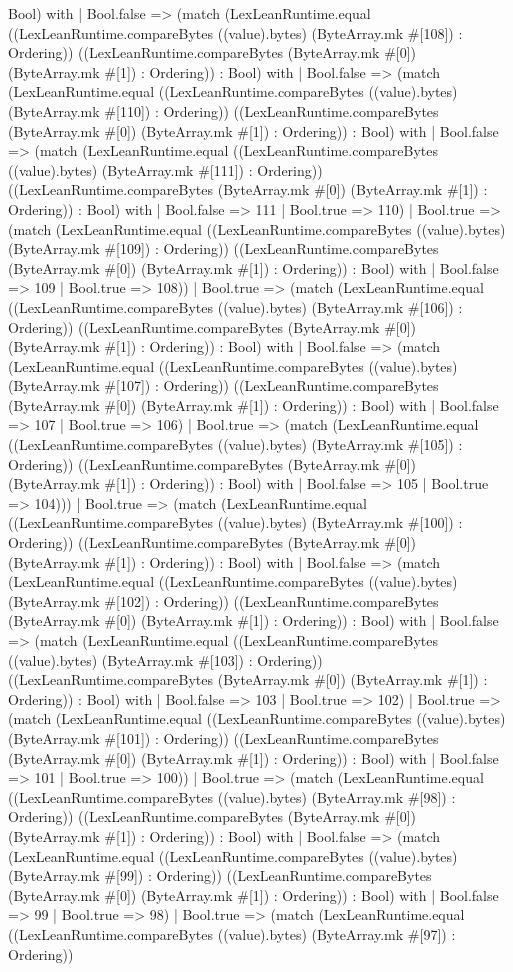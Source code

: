 \documentclass[11pt]{article}
\begin{document}
Bool) with | Bool.false => (match (LexLeanRuntime.equal ((LexLeanRuntime.compareBytes ((value).bytes) (ByteArray.mk \#[108]) : Ordering)) ((LexLeanRuntime.compareBytes (ByteArray.mk \#[0]) (ByteArray.mk \#[1]) : Ordering)) : Bool) with | Bool.false => (match (LexLeanRuntime.equal ((LexLeanRuntime.compareBytes ((value).bytes) (ByteArray.mk \#[110]) : Ordering)) ((LexLeanRuntime.compareBytes (ByteArray.mk \#[0]) (ByteArray.mk \#[1]) : Ordering)) : Bool) with | Bool.false => (match (LexLeanRuntime.equal ((LexLeanRuntime.compareBytes ((value).bytes) (ByteArray.mk \#[111]) : Ordering)) ((LexLeanRuntime.compareBytes (ByteArray.mk \#[0]) (ByteArray.mk \#[1]) : Ordering)) : Bool) with | Bool.false => 111 | Bool.true => 110) | Bool.true => (match (LexLeanRuntime.equal ((LexLeanRuntime.compareBytes ((value).bytes) (ByteArray.mk \#[109]) : Ordering)) ((LexLeanRuntime.compareBytes (ByteArray.mk \#[0]) (ByteArray.mk \#[1]) : Ordering)) : Bool) with | Bool.false => 109 | Bool.true => 108)) | Bool.true => (match (LexLeanRuntime.equal ((LexLeanRuntime.compareBytes ((value).bytes) (ByteArray.mk \#[106]) : Ordering)) ((LexLeanRuntime.compareBytes (ByteArray.mk \#[0]) (ByteArray.mk \#[1]) : Ordering)) : Bool) with | Bool.false => (match (LexLeanRuntime.equal ((LexLeanRuntime.compareBytes ((value).bytes) (ByteArray.mk \#[107]) : Ordering)) ((LexLeanRuntime.compareBytes (ByteArray.mk \#[0]) (ByteArray.mk \#[1]) : Ordering)) : Bool) with | Bool.false => 107 | Bool.true => 106) | Bool.true => (match (LexLeanRuntime.equal ((LexLeanRuntime.compareBytes ((value).bytes) (ByteArray.mk \#[105]) : Ordering)) ((LexLeanRuntime.compareBytes (ByteArray.mk \#[0]) (ByteArray.mk \#[1]) : Ordering)) : Bool) with | Bool.false => 105 | Bool.true => 104))) | Bool.true => (match (LexLeanRuntime.equal ((LexLeanRuntime.compareBytes ((value).bytes) (ByteArray.mk \#[100]) : Ordering)) ((LexLeanRuntime.compareBytes (ByteArray.mk \#[0]) (ByteArray.mk \#[1]) : Ordering)) : Bool) with | Bool.false => (match (LexLeanRuntime.equal ((LexLeanRuntime.compareBytes ((value).bytes) (ByteArray.mk \#[102]) : Ordering)) ((LexLeanRuntime.compareBytes (ByteArray.mk \#[0]) (ByteArray.mk \#[1]) : Ordering)) : Bool) with | Bool.false => (match (LexLeanRuntime.equal ((LexLeanRuntime.compareBytes ((value).bytes) (ByteArray.mk \#[103]) : Ordering)) ((LexLeanRuntime.compareBytes (ByteArray.mk \#[0]) (ByteArray.mk \#[1]) : Ordering)) : Bool) with | Bool.false => 103 | Bool.true => 102) | Bool.true => (match (LexLeanRuntime.equal ((LexLeanRuntime.compareBytes ((value).bytes) (ByteArray.mk \#[101]) : Ordering)) ((LexLeanRuntime.compareBytes (ByteArray.mk \#[0]) (ByteArray.mk \#[1]) : Ordering)) : Bool) with | Bool.false => 101 | Bool.true => 100)) | Bool.true => (match (LexLeanRuntime.equal ((LexLeanRuntime.compareBytes ((value).bytes) (ByteArray.mk \#[98]) : Ordering)) ((LexLeanRuntime.compareBytes (ByteArray.mk \#[0]) (ByteArray.mk \#[1]) : Ordering)) : Bool) with | Bool.false => (match (LexLeanRuntime.equal ((LexLeanRuntime.compareBytes ((value).bytes) (ByteArray.mk \#[99]) : Ordering)) ((LexLeanRuntime.compareBytes (ByteArray.mk \#[0]) (ByteArray.mk \#[1]) : Ordering)) : Bool) with | Bool.false => 99 | Bool.true => 98) | Bool.true => (match (LexLeanRuntime.equal ((LexLeanRuntime.compareBytes ((value).bytes) (ByteArray.mk \#[97]) : Ordering)) 
\end{document}
